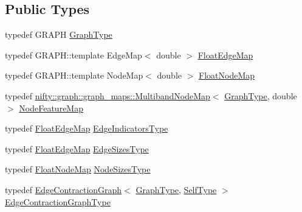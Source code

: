 \subsection*{Public Types}
\begin{DoxyCompactItemize}
\item 
typedef G\+R\+A\+P\+H \hyperlink{classnifty_1_1graph_1_1agglo_1_1NodeAndEdgeWeightedClusterPolicy_a293d476ffc7b8513eeb20c21bfefb579}{Graph\+Type}
\item 
typedef G\+R\+A\+P\+H\+::template Edge\+Map$<$ double $>$ \hyperlink{classnifty_1_1graph_1_1agglo_1_1NodeAndEdgeWeightedClusterPolicy_ad96ecbc93cd5424b2d5dd013439820ca}{Float\+Edge\+Map}
\item 
typedef G\+R\+A\+P\+H\+::template Node\+Map$<$ double $>$ \hyperlink{classnifty_1_1graph_1_1agglo_1_1NodeAndEdgeWeightedClusterPolicy_a0962d8b4fc0f7612af92d81d5a8b1ff6}{Float\+Node\+Map}
\item 
typedef \hyperlink{structnifty_1_1graph_1_1graph__maps_1_1MultibandNodeMap}{nifty\+::graph\+::graph\+\_\+maps\+::\+Multiband\+Node\+Map}$<$ \hyperlink{classnifty_1_1graph_1_1agglo_1_1NodeAndEdgeWeightedClusterPolicy_a293d476ffc7b8513eeb20c21bfefb579}{Graph\+Type}, double $>$ \hyperlink{classnifty_1_1graph_1_1agglo_1_1NodeAndEdgeWeightedClusterPolicy_aa07dae5e9a8be0e547eb7d1e9921dd05}{Node\+Feature\+Map}
\item 
typedef \hyperlink{classnifty_1_1graph_1_1agglo_1_1NodeAndEdgeWeightedClusterPolicy_ad96ecbc93cd5424b2d5dd013439820ca}{Float\+Edge\+Map} \hyperlink{classnifty_1_1graph_1_1agglo_1_1NodeAndEdgeWeightedClusterPolicy_a708c515ae905c01d71d590976fb06ebb}{Edge\+Indicators\+Type}
\item 
typedef \hyperlink{classnifty_1_1graph_1_1agglo_1_1NodeAndEdgeWeightedClusterPolicy_ad96ecbc93cd5424b2d5dd013439820ca}{Float\+Edge\+Map} \hyperlink{classnifty_1_1graph_1_1agglo_1_1NodeAndEdgeWeightedClusterPolicy_a3026f9b9f7061857a7d6c833c1b2fafb}{Edge\+Sizes\+Type}
\item 
typedef \hyperlink{classnifty_1_1graph_1_1agglo_1_1NodeAndEdgeWeightedClusterPolicy_a0962d8b4fc0f7612af92d81d5a8b1ff6}{Float\+Node\+Map} \hyperlink{classnifty_1_1graph_1_1agglo_1_1NodeAndEdgeWeightedClusterPolicy_a47dc2122410c8a113e4b14664be633c7}{Node\+Sizes\+Type}
\item 
typedef \hyperlink{classnifty_1_1graph_1_1EdgeContractionGraph}{Edge\+Contraction\+Graph}$<$ \hyperlink{classnifty_1_1graph_1_1agglo_1_1NodeAndEdgeWeightedClusterPolicy_a293d476ffc7b8513eeb20c21bfefb579}{Graph\+Type}, \hyperlink{classnifty_1_1graph_1_1agglo_1_1NodeAndEdgeWeightedClusterPolicy}{Self\+Type} $>$ \hyperlink{classnifty_1_1graph_1_1agglo_1_1NodeAndEdgeWeightedClusterPolicy_a467e2768e424a998379deedaaebfe9a9}{Edge\+Contraction\+Graph\+Type}
\end{DoxyCompactItemize}

